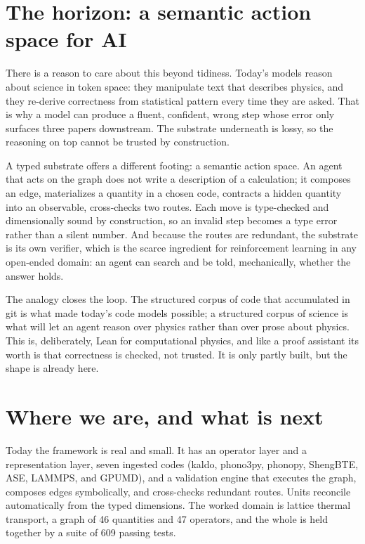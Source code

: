 \documentclass[11pt,a4paper]{article}
\begin{document}
\section{The horizon: a semantic action space for AI}

There is a reason to care about this beyond tidiness. Today's models reason about
science in token space: they manipulate text that describes physics, and they
re-derive correctness from statistical pattern every time they are asked. That is
why a model can produce a fluent, confident, wrong step whose error only surfaces
three papers downstream. The substrate underneath is lossy, so the reasoning on
top cannot be trusted by construction.

A typed substrate offers a different footing: a semantic action space. An agent
that acts on the graph does not write a description of a calculation; it composes
an edge, materializes a quantity in a chosen code, contracts a hidden quantity into
an observable, cross-checks two routes. Each move is type-checked and dimensionally
sound by construction, so an invalid step becomes a type error rather than a silent
number. And because the routes are redundant, the substrate is its own verifier,
which is the scarce ingredient for reinforcement learning in any open-ended domain:
an agent can search and be told, mechanically, whether the answer holds.

The analogy closes the loop. The structured corpus of code that accumulated in git
is what made today's code models possible; a structured corpus of science is what
will let an agent reason over physics rather than over prose about physics. This
is, deliberately, Lean for computational physics, and like a proof assistant its
worth is that correctness is checked, not trusted. It is only partly built, but the
shape is already here.

\section{Where we are, and what is next}

Today the framework is real and small. It has an operator layer and a
representation layer, seven ingested codes (kaldo, phono3py, phonopy, ShengBTE,
ASE, LAMMPS, and GPUMD), and a validation engine that executes the graph, composes
edges symbolically, and cross-checks redundant routes. Units reconcile
automatically from the typed dimensions. The worked domain is lattice thermal
transport, a graph of 46 quantities and 47 operators, and the whole is held
together by a suite of 609 passing tests.
\end{document}
